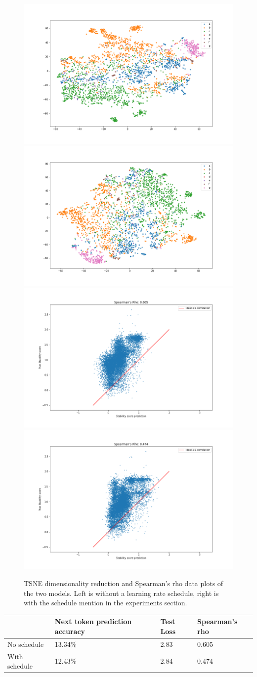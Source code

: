 \begin{figure}[!ht]
  \centering
  \includegraphics[width=0.49\linewidth]{latex/imgs/tsne_1_layer_no_schedule_512_final.png}
  \includegraphics[width=0.49\linewidth]{latex/imgs/tsne_1_layer_with_schedule_512_final.png}
  \includegraphics[width=0.49\linewidth]{latex/imgs/spearman_1_layer_no_schedule_512_final.png}
  \includegraphics[width=0.49\linewidth]{latex/imgs/spearman_1_layer_with_schedule_512_final.png}
  \caption{TSNE dimensionality reduction  and Spearman's rho data plots of the two models. Left is without a learning rate schedule, right is with the schedule mention in the experiments section.}
  \label{fig:small_cluster_spearman}
\end{figure}

\begin{table}[!ht]
\begin{tabular}{|l|l|l|l|}
\hline
              & Next token prediction accuracy & Test Loss & Spearman's rho\\ \hline
No schedule   & 13.34\%                        & 2.83      & 0.605         \\ \hline
With schedule & 12.43\%                        & 2.84      & 0.474         \\ \hline
\end{tabular}
\end{table}